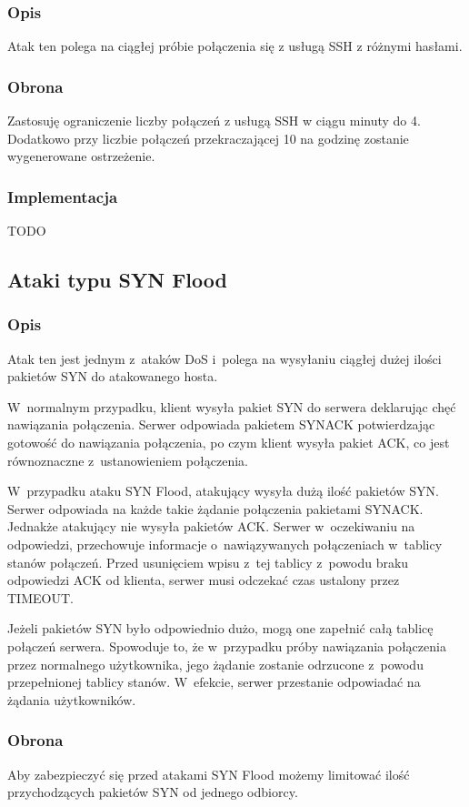 \documentclass[a4paper,10pt]{article}
\begin{document}
		\subsubsection{Opis}
			Atak ten polega na ciągłej próbie połączenia się z usługą SSH z różnymi hasłami.
		\subsubsection{Obrona}
			Zastosuję ograniczenie liczby połączeń z usługą SSH w ciągu minuty do 4.\\
			Dodatkowo przy liczbie połączeń przekraczającej 10 na godzinę zostanie wygenerowane ostrzeżenie.
		\subsubsection{Implementacja}
			TODO
	\subsection{Ataki typu SYN Flood}
		\subsubsection{Opis}
			Atak ten jest jednym z~ataków DoS i~polega na wysyłaniu ciągłej dużej ilości pakietów SYN do atakowanego hosta.

			W~normalnym przypadku, klient wysyła pakiet SYN do serwera deklarując chęć nawiązania połączenia. Serwer odpowiada pakietem SYN\dywiz ACK potwierdzając gotowość do nawiązania połączenia, po czym klient wysyła pakiet ACK, co jest równoznaczne z~ustanowieniem połączenia.

			W~przypadku ataku SYN Flood, atakujący wysyła dużą ilość pakietów SYN. Serwer odpowiada na każde takie żądanie połączenia pakietami SYN\dywiz ACK. Jednakże atakujący nie wysyła pakietów ACK. Serwer w~oczekiwaniu na odpowiedzi, przechowuje informacje o~nawiązywanych połączeniach w~tablicy stanów połączeń. Przed usunięciem wpisu z~tej tablicy z~powodu braku odpowiedzi ACK od klienta, serwer musi odczekać czas ustalony przez TIMEOUT.

			Jeżeli pakietów SYN było odpowiednio dużo, mogą one zapełnić całą tablicę połączeń serwera. Spowoduje to, że w~przypadku próby nawiązania połączenia przez normalnego użytkownika, jego żądanie zostanie odrzucone z~powodu przepełnionej tablicy stanów. W~efekcie, serwer przestanie odpowiadać na żądania użytkowników.
		\subsubsection{Obrona}
			Aby zabezpieczyć się przed atakami SYN Flood możemy limitować ilość przychodzących pakietów SYN od jednego odbiorcy.
\end{document}
